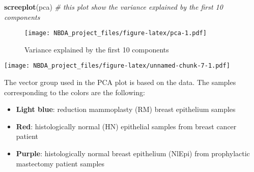 \documentclass[
]{article}
\newenvironment{Shaded}{\begin{snugshade}}{\end{snugshade}}
\newcommand{\AttributeTok}[1]{\textcolor[rgb]{0.13,0.29,0.53}{#1}}
\newcommand{\CommentTok}[1]{\textcolor[rgb]{0.56,0.35,0.01}{\textit{#1}}}
\newcommand{\DecValTok}[1]{\textcolor[rgb]{0.00,0.00,0.81}{#1}}
\newcommand{\FloatTok}[1]{\textcolor[rgb]{0.00,0.00,0.81}{#1}}
\newcommand{\FunctionTok}[1]{\textcolor[rgb]{0.13,0.29,0.53}{\textbf{#1}}}
\newcommand{\NormalTok}[1]{#1}
\newcommand{\OtherTok}[1]{\textcolor[rgb]{0.56,0.35,0.01}{#1}}
\newcommand{\SpecialCharTok}[1]{\textcolor[rgb]{0.81,0.36,0.00}{\textbf{#1}}}
\newcommand{\StringTok}[1]{\textcolor[rgb]{0.31,0.60,0.02}{#1}}
\begin{document}
\begin{Shaded}
\begin{Highlighting}[]
\FunctionTok{screeplot}\NormalTok{(pca) }\CommentTok{\# this plot show the variance explained by the first 10 components}
\end{Highlighting}
\end{Shaded}

\begin{figure}
\centering
\texttt{[image: NBDA\_project\_files/figure-latex/pca-1.pdf]}
\caption{Variance explained by the first 10 components}
\end{figure}

\begin{Shaded}
\end{Shaded}

\texttt{[image: NBDA\_project\_files/figure-latex/unnamed-chunk-7-1.pdf]}

The vector group used in the PCA plot is based on the data. The samples
corresponding to the colors are the following:

\begin{itemize}
\item
  \textbf{Light blue}: reduction mammoplasty (RM) breast epithelium
  samples
\item
  \textbf{Red}: histologically normal (HN) epithelial samples from
  breast cancer patient
\item
  \textbf{Purple}: histologically normal breast epithelium (NlEpi) from
  prophylactic mastectomy patient samples
\end{itemize}
\end{document}
